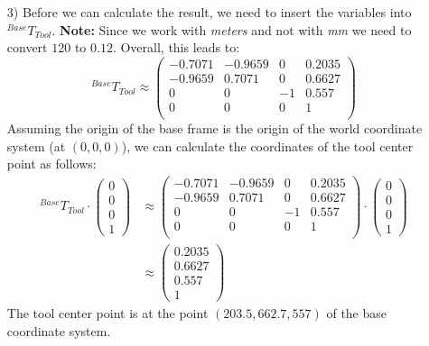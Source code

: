 \documentclass[a4paper,11pt]{article}
\begin{document}
\begin {enumerate}
\begin{enumerate}
        \item[3)] Before we can calculate the result, we need to insert the variables into ${^{Base}T_{Tool}}$. \textbf{Note:} Since we work with \textit{meters} and not with \textit{mm} we need to convert $120$ to $0.12$. Overall, this leads to:
        $${^{Base}T_{Tool}} \approx \begin{pmatrix}
            -0.7071 & -0.9659 & 0 & 0.2035\\
            -0.9659 & 0.7071 & 0 & 0.6627\\
            0 & 0 & -1 & 0.557\\
            0 & 0 & 0 & 1 \\
        \end{pmatrix}$$
        Assuming the origin of the base frame is the origin of the world coordinate system (at $(0,0,0)$), we can calculate the coordinates of the tool center point as follows:
        \begin{align*}
            {^{Base}T_{Tool}} \cdot \begin{pmatrix}
                0\\0\\0\\1
            \end{pmatrix} &\approx \begin{pmatrix}
            -0.7071 & -0.9659 & 0 & 0.2035\\
            -0.9659 & 0.7071 & 0 & 0.6627\\
            0 & 0 & -1 & 0.557\\
            0 & 0 & 0 & 1 \\
        \end{pmatrix} \cdot \begin{pmatrix}
                0\\0\\0\\1
            \end{pmatrix}\\
        &\approx \begin{pmatrix}
                0.2035\\0.6627\\0.557\\1
            \end{pmatrix}
        \end{align*}
        The tool center point is at the point $(203.5, 662.7, 557)$ of the base coordinate system.


    \end{enumerate}

\end {enumerate}
\end{document}
